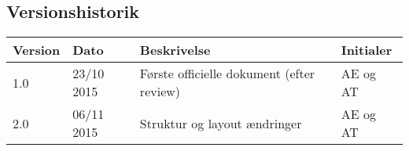 \subsection{Versionshistorik}

\begin{center}
		\begin{longtable}{ | m{1.5cm} | m{2cm}| m{7.5cm}| m{2cm}| } 
			\hline
			\textbf{Version} & \textbf{Dato} &  \textbf{Beskrivelse} & \textbf{Initialer}  \\ 
			\hline
			1.0  & 23/10 2015 & Første officielle dokument (efter review) & AE og AT \\
			\hline
			2.0  & 06/11 2015 & Struktur og layout ændringer & AE og AT \\
			\hline
		\end{longtable}	
	\end{center}